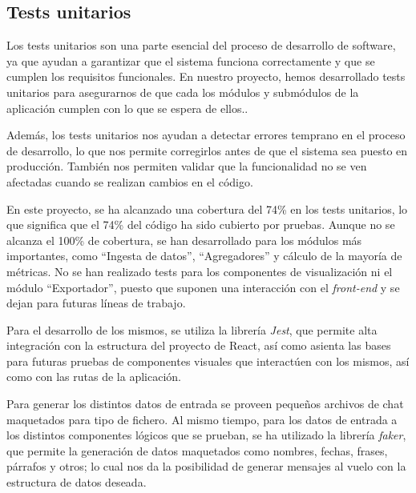 \subsection{Tests unitarios}

Los tests unitarios son una parte esencial del proceso de desarrollo de software, ya que ayudan a garantizar que el sistema funciona correctamente y que se cumplen los requisitos funcionales. En nuestro proyecto, hemos desarrollado tests unitarios para asegurarnos de que cada los módulos y submódulos de la aplicación cumplen con lo que se espera de ellos..

Además, los tests unitarios nos ayudan a detectar errores temprano en el proceso de desarrollo, lo que nos permite corregirlos antes de que el sistema sea puesto en producción. También nos permiten validar que la funcionalidad no se ven afectadas cuando se realizan cambios en el código.

En este proyecto, se ha alcanzado una cobertura del 74\% en los tests unitarios, lo que significa que el 74\% del código ha sido cubierto por pruebas. Aunque no se alcanza el 100\% de cobertura, se han desarrollado para los módulos más importantes, como ``Ingesta de datos'', ``Agregadores'' y cálculo de la mayoría de métricas. No se han realizado tests para los componentes de visualización ni el módulo ``Exportador'', puesto que suponen una interacción con el \textit{front-end} y se dejan para futuras líneas de trabajo.

Para el desarrollo de los mismos, se utiliza la librería \textit{Jest}, que permite alta integración con la estructura del proyecto de React, así como asienta las bases para futuras pruebas de componentes visuales que interactúen con los mismos, así como con las rutas de la aplicación.

Para generar los distintos datos de entrada se proveen pequeños archivos de chat maquetados para tipo de fichero. Al mismo tiempo, para los datos de entrada a los distintos componentes lógicos que se prueban, se ha utilizado la librería \textit{faker}, que permite la generación de datos maquetados como nombres, fechas, frases, párrafos y otros; lo cual nos da la posibilidad de generar mensajes al vuelo con la estructura de datos deseada.

